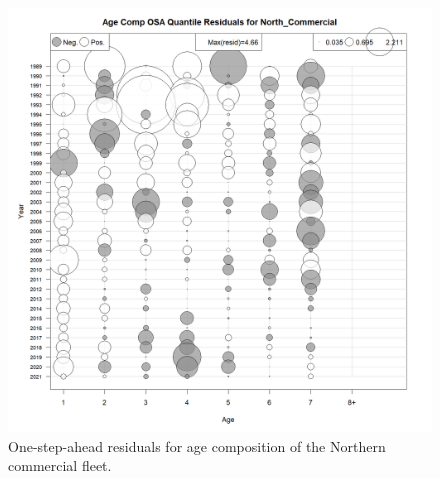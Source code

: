 \documentclass[
]{article}
\begin{document}
\begin{figure}

{\centering \includegraphics[width=1\linewidth]{../2023.RT.Runs/Run34/plots_png/diagnostics/Catch_age_comp_osa_resids_North_Commercial} 

}

\caption{One-step-ahead residuals for age composition of the Northern commercial fleet.}\label{fig:osa-North-comm-paa}
\end{figure}
\end{document}
